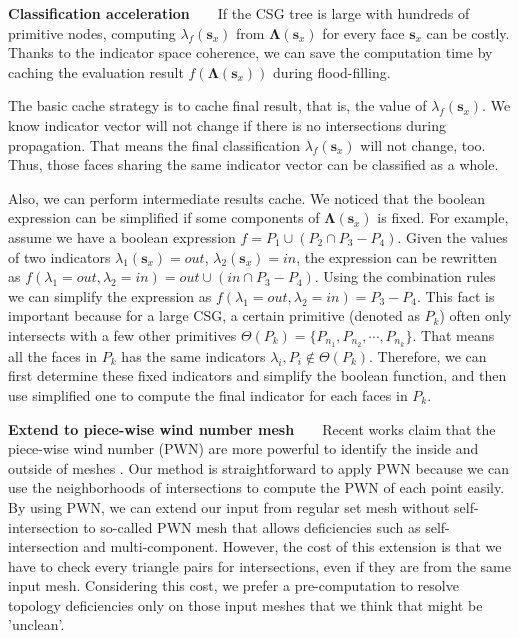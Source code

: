 \documentclass[10pt,journal,compsoc]{IEEEtran}
\begin{document}
\vspace{0.5em}
\noindent\textbf{Classification acceleration}~~~~If the CSG tree is large with hundreds of primitive nodes, computing $\lambda_f(\bm{s}_x)$ from $\boldsymbol{\Lambda}(\bm{s}_x)$ for every face $\bm{s}_x$ can be costly. Thanks to the indicator space coherence, we can save the computation time by caching the evaluation result $f(\boldsymbol{\Lambda}(\bm{s}_x))$ during flood-filling.

The basic cache strategy is to cache final result, that is, the value of $\lambda_f(\bm{s}_x)$. We know indicator vector will not change if there is no intersections during propagation. That means the final classification $\lambda_f(\bm{s}_x)$ will not change, too. Thus, those faces sharing the same indicator vector can be classified as a whole.

Also, we can perform intermediate results cache. We noticed that the boolean expression can be simplified if some components of $\boldsymbol{\Lambda}(\bm{s}_x)$ is fixed. For example, assume we have a boolean expression $f = P_1\cup (P_2\cap P_3-P_4)$. Given the values of two indicators $\lambda_1(\bm{s}_x)=out$, $\lambda_2(\bm{s}_x)=in$, the expression can be rewritten as $f(\lambda_1=out, \lambda_2=in)=out\cup (in\cap P_3-P_4)$. Using the combination rules we can simplify the expression as $f(\lambda_1=out, \lambda_2=in)=P_3-P_4$. This fact is important because for a large CSG, a certain primitive (denoted as $P_k$) often only intersects with a few other primitives $\Theta(P_k)= \{P_{n_1}, P_{n_2}, \cdots, P_{n_k}\}$. That means all the faces in $P_k$ has the same indicators $\lambda_{i}, P_{i} \notin \Theta(P_k)$. Therefore, we can first determine these fixed indicators and simplify the boolean function, and then use simplified one to compute the final indicator for each faces in $P_k$.

\vspace{0.5em}
\noindent\textbf{Extend to piece-wise wind number mesh}~~~~Recent works claim that the piece-wise wind number (PWN) are more powerful to identify the inside and outside of meshes \cite{zhou2016mesh}. Our method is straightforward to apply PWN because we can use the neighborhoods of intersections to compute the PWN of each point easily. By using PWN, we can extend our input from regular set mesh without self-intersection to so-called PWN mesh that allows deficiencies such as self-intersection and multi-component. However, the cost of this extension is that we have to check every triangle pairs for intersections, even if they are from the same input mesh. Considering this cost, we prefer a pre-computation to resolve topology deficiencies only on those input meshes that we think that might be 'unclean'.
\end{document}
